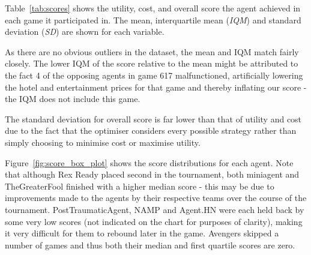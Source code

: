 \documentclass{acm_proc_article-sp}
\begin{document}
Table~\ref{tab:scores} shows the utility, cost, and overall score the agent achieved in each game it participated in. The mean, interquartile mean (\emph{IQM}) and standard deviation (\emph{SD}) are shown for each variable.

As there are no obvious outliers in the dataset, the mean and IQM match fairly closely. The lower IQM of the score relative to the mean might be attributed to the fact 4 of the opposing agents in game 617 malfunctioned, artificially lowering the hotel and entertainment prices for that game and thereby inflating our score - the IQM does not include this game.

The standard deviation for overall score is far lower than that of utility and cost due to the fact that the optimiser considers every possible strategy rather than simply choosing to minimise cost or maximise utility.

Figure~\ref{fig:score_box_plot} shows the score distributions for each agent. Note that although Rex Ready placed second in the tournament, both miniagent and TheGreaterFool finished with a higher median score - this may be due to improvements made to the agents by their respective teams over the course of the tournament. PostTraumaticAgent, NAMP and Agent.HN were each held back by some very low scores (not indicated on the chart for purposes of clarity), making it very difficult for them to rebound later in the game. Avengers skipped a number of games and thus both their median and first quartile scores are zero.




\balancecolumns
\end{document}
